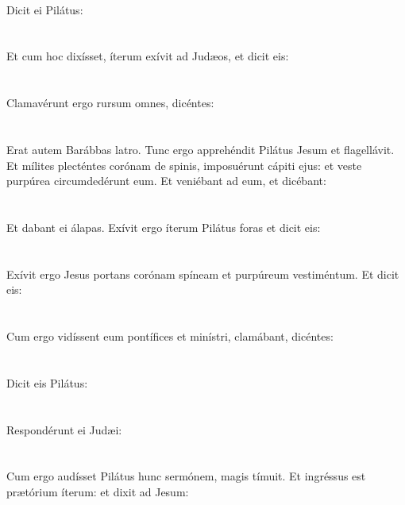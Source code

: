 \documentclass[12pt, a4paper]{article}
\begin{document}
	\\
	Dicit ei Pilátus:
	\\\\
	\\
	Et cum hoc dixísset, íterum exívit ad Judæos, et dicit eis:
	\\\\
	\\
	Clamavérunt ergo rursum omnes, dicéntes:
	\\\\
	\\
	Erat autem Barábbas latro. Tunc ergo apprehéndit Pilátus Jesum et flagellávit. Et mílites plecténtes corónam de spinis, imposuérunt cápiti ejus: et veste purpúrea circumdedérunt eum. Et veniébant ad eum, et dicébant:
	\\\\
	\\
	Et dabant ei álapas. Exívit ergo íterum Pilátus foras et dicit eis:
	\\\\
	\\
	Exívit ergo Jesus portans corónam spíneam et purpúreum vestiméntum. Et dicit eis:
	\\\\
	\\
	Cum ergo vidíssent eum pontífices et minístri, clamábant, dicéntes:
	\\\\
	\\
	Dicit eis Pilátus:
	\\\\
	\\
	Respondérunt ei Judæi:
	\\\\
	\\
	Cum ergo audísset Pilátus hunc sermónem, magis tímuit. Et ingréssus est prætórium íterum: et dixit ad Jesum:
\end{document}
